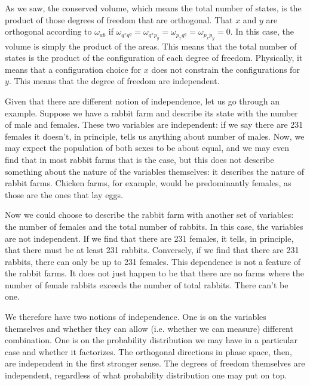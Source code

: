 As we saw, the conserved volume, which means the total number of states, is the product of those degrees of freedom that are orthogonal. That $x$ and $y$ are orthogonal according to $\omega_{ab}$ if $\omega_{q^x q^y} = \omega_{q^x p_y} = \omega_{p_x q^y} = \omega_{p_x p_y} = 0$. In this case, the volume is simply the product of the areas. This means that the total number of states is the product of the configuration of each degree of freedom. Physically, it means that a configuration choice for $x$ does not constrain the configurations for $y$. This means that the degree of freedom are independent.

Given that there are different notion of independence, let us go through an example. Suppose we have a rabbit farm and describe its state with the number of male and females. These two variables are independent: if we say there are 231 females it doesn't, in principle, tells us anything about number of males. Now, we may expect the population of both sexes to be about equal, and we may even find that in most rabbit farms that is the case, but this does not describe something about the nature of the variables themselves: it describes the nature of rabbit farms. Chicken farms, for example, would be predominantly females, as those are the ones that lay eggs.

Now we could choose to describe the rabbit farm with another set of variables: the number of females and the total number of rabbits. In this case, the variables are not independent. If we find that there are 231 females, it tells, in principle, that there must be at least 231 rabbits. Conversely, if we find that there are 231 rabbits, there can only be up to 231 females. This dependence is not a feature of the rabbit farms. It does not just happen to be that there are no farms where the number of female rabbits exceeds the number of total rabbits. There can't be one.

We therefore have two notions of independence. One is on the variables themselves and whether they can allow (i.e. whether we can measure) different combination. One is on the probability distribution we may have in a particular case and whether it factorizes. The orthogonal directions in phase space, then, are independent in the first stronger sense. The degrees of freedom themselves are independent, regardless of what probability distribution one may put on top.

